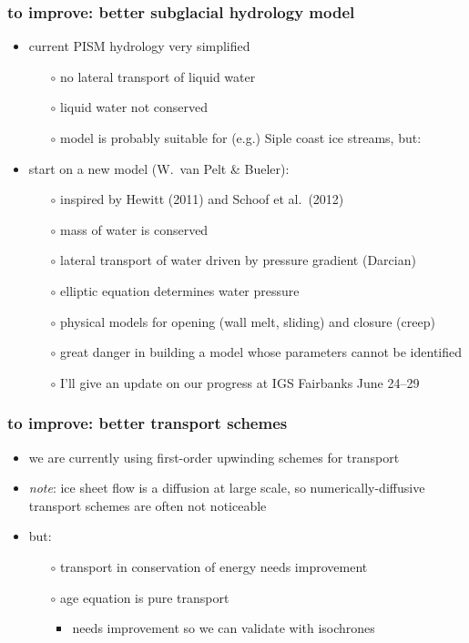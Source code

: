 \documentclass[hide notes,intlimits]{beamer}
\begin{document}
\begin{frame}
  \frametitle{to improve: better subglacial hydrology model}
  \begin{itemize}
  \item current PISM hydrology very simplified
    \begin{itemize}
    \item[$\circ$] no lateral transport of liquid water
    \item[$\circ$] liquid water not conserved
    \item[$\circ$] model is probably suitable for (e.g.) Siple coast ice streams, \alert{but}:
    \end{itemize}
  \item start on a new model (W.~van Pelt \& Bueler):
    \begin{itemize}
    \item[$\circ$] inspired by Hewitt (2011) and Schoof et al.~(2012)
    \item[$\circ$] mass of water is conserved
    \item[$\circ$] lateral transport of water driven by pressure gradient (Darcian)
    \item[$\circ$] elliptic equation determines water pressure
    \item[$\circ$] physical models for opening (wall melt, sliding) and closure (creep)
    \item[$\circ$] \alert{great danger} in building a model whose parameters cannot be identified
    \item[$\circ$] I'll give an update on our progress at IGS Fairbanks June 24--29
    \end{itemize}
  \end{itemize}
\end{frame}


\begin{frame}
  \frametitle{to improve: better transport schemes}
  \begin{itemize}
  \item we are currently using first-order upwinding schemes for transport
  \item \emph{note}: ice sheet flow is a diffusion at large scale, so numerically-diffusive transport schemes are often not noticeable
  \item \alert{but}:
    \begin{itemize}
    \item[$\circ$] transport in conservation of energy needs improvement
    \item[$\circ$] age equation is pure transport
      \begin{itemize}
      \item needs improvement so we can validate with isochrones
      \end{itemize}
    \end{itemize}
  \end{itemize}
\end{frame}
\end{document}
